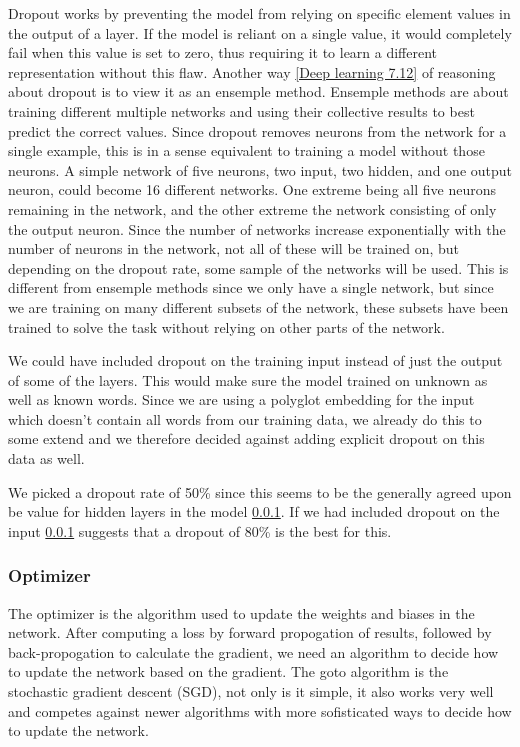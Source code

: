 Dropout works by preventing the model from relying on specific element values in
the output of a layer. If the model is reliant on a single value, it would
completely fail when this value is set to zero, thus requiring it to learn a
different representation without this flaw. Another way \ref{Deep learning 7.12}
of reasoning about dropout is to view it as an ensemple method. Ensemple methods
are about training different multiple networks and using their collective
results to best predict the correct values. Since dropout removes neurons from
the network for a single example, this is in a sense equivalent to training a
model without those neurons. A simple network of five neurons, two input, two
hidden, and one output neuron, could become 16 different networks. One extreme
being all five neurons remaining in the network, and the other extreme the
network consisting of only the output neuron. Since the number of networks
increase exponentially with the number of neurons in the network, not all of
these will be trained on, but depending on the dropout rate, some sample of the
networks will be used. This is different from ensemple methods since we only
have a single network, but since we are training on many different subsets of
the network, these subsets have been trained to solve the task without relying
on other parts of the network. 

We could have included dropout on the training input instead of just the output
of some of the layers. This would make sure the model trained on unknown as well
as known words. Since we are using a polyglot embedding for the input which
doesn't contain all words from our training data, we already do this to some
extend and we therefore decided against adding explicit dropout on this data as
well.

We picked a dropout rate of 50\% since this seems to be the generally agreed
upon be value for hidden layers in the model \ref{}. If we had included dropout
on the input \ref{} suggests that a dropout of 80\% is the best for this.


\subsubsection{Optimizer}

The optimizer is the algorithm used to update the weights and biases in the
network. After computing a loss by forward propogation of results, followed by
back-propogation to calculate the gradient, we need an algorithm to decide how
to update the network based on the gradient. The goto algorithm is the
stochastic gradient descent (SGD), not only is it simple, it also works very
well and competes against newer algorithms with more sofisticated ways to decide
how to update the network.

